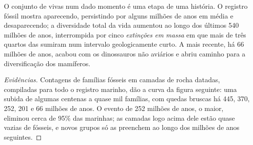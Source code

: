 \begin{proposition}\label{prop:g10:biodiversity-scales:changes}
O conjunto de  vivas num dado momento é uma etapa de uma
história. O registro fóssil mostra  aparecendo, persistindo por
alguns milhões de anos em média e desaparecendo; a diversidade total da
vida aumentou ao longo dos últimos 540 milhões de anos, interrompida
por cinco \emph{extinções em massa} em que
mais de três quartos das  sumiram num intervalo geologicamente
curto. A mais recente, há 66 milhões de anos, acabou com os dinossauros
não aviários e abriu caminho para a diversificação dos mamíferos.
\end{proposition}
\begin{proof}[Evidências]
Contagens de famílias fósseis em camadas de rocha datadas, compiladas
para todo o registro marinho, dão a curva da figura seguinte: uma
subida de algumas centenas a quase mil famílias, com quedas bruscas há
445, 370, 252, 201 e 66 milhões de anos. O evento de 252 milhões de
anos, o maior, eliminou cerca de 95\% das  marinhas; as camadas
logo acima dele estão quase vazias de fósseis, e novos grupos só as
preenchem ao longo dos milhões de anos seguintes.
\end{proof}

